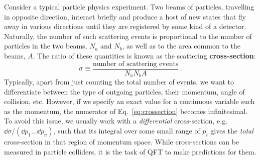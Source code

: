 \documentclass[main.tex]{subfiles}
\begin{document}
Consider a typical particle physics experiment. Two beams of particles, travelling in opposite direction, interact briefly and produce a host of new states that fly away in various directions until they are registered by some kind of a detector. Naturally, the number of such scattering events is proportional to the number of particles in the two beams, $N_a$ and $N_b$, as well as to the area common to the beams, $A$. The ratio of these quantities is known as the scattering \textbf{cross-section}:
\begin{equation} \label{eq:crossection}
    \sigma \equiv \frac{\text{number of scattering events}}{N_a N_b A}\,.
\end{equation}
Typically, apart from just counting the total number of events, we want to differentiate between the type of outgoing particles, their momentum, angle of collision, etc. However, if we specify an exact value for a continuous variable such as the momentum, the numerator of Eq.~\ref{eq:crossection} becomes infinitesimal. To avoid this issue, we usually work with a \textit{differential} cross-section, e.g. $\dd\sigma/(\dd p_1 \ldots \dd p_n)$, such that its integral over some small range of $p_i$ gives the \textit{total} cross-section in that region of momentum space. While cross-sections can be measured in particle colliders, it is the task of QFT to make predictions for them.
\end{document}
